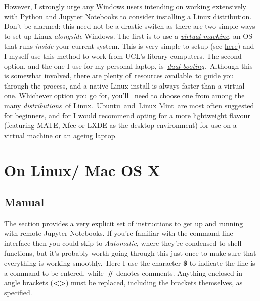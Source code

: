\documentclass[10pt,a4]{article}
\begin{document}
However, I strongly urge any Windows users intending on working
extensively with Python and Jupyter Notebooks to consider installing a
Linux distribution. Don't be alarmed: this need not be a drastic switch
as there are two simple ways to set up Linux \emph{alongside} Windows.
The first is to use a
\emph{\href{https://www.howtogeek.com/196060/beginner-geek-how-to-create-and-use-virtual-machines/}{virtual
machine}}, an OS that runs \emph{inside} your current system. This is
very simple to setup (see
\href{http://www.storagecraft.com/blog/the-dead-simple-guide-to-installing-a-linux-virtual-machine-on-windows/}{here})
and I myself use this method to work from UCL's library computers. The
second option, and the one I use for my personal laptop,
is~\emph{\href{https://www.howtogeek.com/187789/dual-booting-explained-how-you-can-have-multiple-operating-systems-on-your-computer/}{dual-booting}.}~Although
this is somewhat involved, there are
\href{https://itsfoss.com/guide-install-linux-mint-16-dual-boot-windows/}{plenty}
\href{https://www.lifewire.com/ultimate-windows-7-ubuntu-linux-dual-boot-guide-2200653}{of}~\href{https://www.howtogeek.com/214571/how-to-dual-boot-linux-on-your-pc/}{resources}
\href{http://www.pcworld.com/article/2955460/operating-systems/dual-booting-linux-with-windows-what-you-need-to-know.html}{available}~to
guide you through the process, and a native Linux install is always
faster than a virtual one. Whichever option you go for, you'll ~need to
choose one from among the many
\emph{\href{http://distrowatch.com/dwres.php?resource=major}{distributions}~}of
Linux.~\href{https://www.ubuntu.com/download}{Ubuntu}~and~\href{https://linuxmint.com/}{Linux
Mint}~are most often suggested for beginners, and for I would recommend
opting for a more lightweight flavour (featuring MATE, Xfce or LXDE as
the desktop environment) for use on a virtual machine or an ageing
laptop.

\section{On Linux/ Mac OS X}

\label{960394}

\subsection{Manual}

\label{450419}

The section provides a very explicit set of instructions to get up and
running with remote Jupyter Notebooks. If you're familiar with the
command-line interface then you could skip to \emph{Automatic}, where
they're condensed to shell functions, but it's probably worth going
through this just once to make sure that everything is working
smoothly.~Here I use the character \textbf{\$} to indicate the line is a
command to be entered, while~\textbf{\#} denotes comments. Anything
enclosed in angle brackets (\textbf{\textless{}\textgreater{}}) must be
replaced, including the brackets themselves, as specified.
\end{document}
